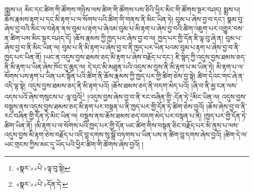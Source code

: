 །སྨྲས་པ། མིང་དང་ཚིག་གི་ཚོགས་གཉིས་ལས་ཚིག་གི་ཚོགས་པས་ཅིའི་ཕྱིར་མིང་གི་ཚོགས་སྔར་བཤད། སྨྲས་པ། ཆོས་རྣམས་རྟག་པ་དང་མི་རྟག་པ་ལ་སོགས་པའི་ཚིག་གི་གནས་ནི་མིང་ཡིན་ཏེ། བུམ་པ་ཞེས་བྱ་བ་དང་། སྣམ་བུ་ཞེས་བྱ་བའི་མིང་ལ་བརྟེན་ནས་བུམ་པ་རྟག་པ་ཞེའམ་བུམ་པ་མི་རྟག་པ་ཞེས་བྱ་བའི་ཚིག་འཇུག་པར་འགྱུར་བས་ན་ཚིག་པས་མིང་སྔར་བཤད་དོ། །ཆོས་རྣམས་ཀྱི་ཁྱད་པར་ཞེས་བྱ་བ་ལ། ཁྱད་པར་གྱི་དོན་ཇི་ལྟ་བུ་ཞེ་ན། བུམ་པ་ཞེས་བྱ་བ་ནི་མིང་ཡིན་ལ། བུམ་པ་ནི་མི་རྟག་པ་ཞེས་བྱ་བ་ནི་ཁྱད་པར་ཡིན་པའམ་བུམ་པ་རྟག་པ་ཞེས་བྱ་བ་ནི་ཁྱད་པར་ཡིན་ནོ། །ཡང་ན་འདུས་བྱས་ཐམས་ཅད་མི་རྟག་པ་ཞེས་བརྗོད་པ་དང་། ཇི་སྙེད་ཀྱི་འདུས་བྱས་ཐམས་ཅད་ནི་མི་རྟག་པ་ཡིན་ཞེས་ཁོང་དུ་ཆུད་ལ། དེ་དང་མི་མཐུན་པའི་འདུས་མ་བྱས་ནི་མི་རྟག་པ་མ་ཡིན་ཏེ། མི་རྟག་པ་ལ་སོགས་པས་རྟག་པ་ཡིན་པར་སྟོན་པའི་ཚིག་ནི་ཆོས་རྣམས་ཀྱི་ཁྱད་པར་གྱི་ཚིག་ཅེས་བྱ་སྟེ། ཚིག་དེའང་གང་ཞེ་ན་འདི་ལྟ་སྟེ། འདུས་བྱས་ཐམས་ཅད་ནི་མི་རྟག་པའོ། །ཆོས་ཐམས་ཅད་ནི་བདག་མེད་པའོ། །ཞི་བ་ནི་མྱ་ངན་ལས་འདས་པའོ་ཞེས་གསུངས་པ་:ལྟ་བུའོ།\footnote{«སྣར་»«པེ་»ལྟ་བུ་སྟེ།} །འདུས་བྱས་ཞེས་བྱ་བ་ནི་རང་བཞིན་གྱི་:དོན་ཏེ་\footnote{«སྣར་»«པེ་»དོན་དེ་}མིང་ཡིན་ལ། འདུས་བྱས་བསྡུས་ནས་འདུས་བྱས་ཐམས་ཅད་མི་རྟག་པར་བསྟན་པ་ནི་ཁྱད་པར་གྱི་དོན་ཏེ་ཚིག་ཅེས་བྱའོ། །ཆོས་ཞེས་བྱ་བ་ནི་རང་བཞིན་གྱི་དོན་ཏེ་མིང་ཡིན་ལ། བསྡུས་ནས་ཆོས་ཐམས་ཅད་བདག་མེད་པར་བསྟན་པ་ནི། །ཁྱད་པར་གྱི་དོན་ཏེ་ཚིག་ཡིན་ནོ། །མི་རྟག་པ་ལ་སོགས་པའི་ཁྱད་པར་གྱི་དོན་ཡང་ཚིག་གིས་བསྟན་ཅིང་བརྗོད་པར་མི་ནུས་པ་ལས་འདུས་བྱས་མི་རྟག་ཅེས་བརྗོད་པ་འདི་བླ་དགས་སུ་སྒྲོ་བཏགས་པ་ཡིན་པས་ན་ཚིག་བླ་དགས་ཞེས་བྱའོ། །ཚིག་དེ་ལ་ཡང་གྲངས་ཀྱིས་མང་དུ་ཡོད་པའི་ཕྱིར་ཚིག་གི་ཚོགས་ཞེས་བྱའོ། །
